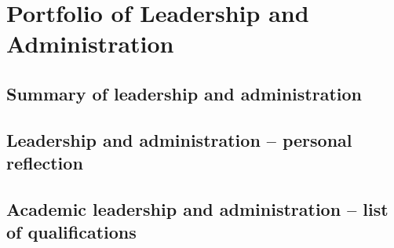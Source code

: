 \chapter{Portfolio of Leadership and Administration}

\section{Summary of leadership and administration} \label{sec:summary-of-leadership-and-administration}

\section{Leadership and administration -- personal reflection} \label{sec:leadership-and-administration-personal-reflection}

\section{Academic leadership and administration -- list of qualifications} \label{sec:academic-leadership-and-administration-list-of-qualifications}
